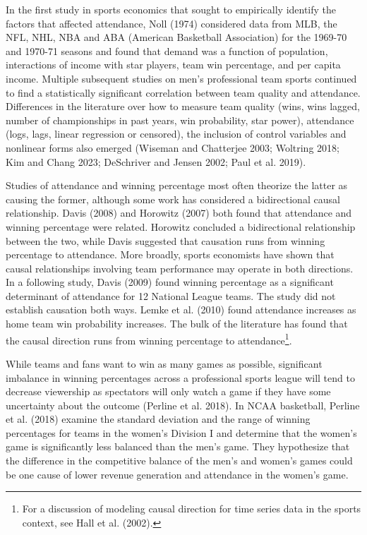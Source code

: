 \documentclass[
  letterpaper,
  DIV=11,
  numbers=noendperiod]{scrartcl}
\begin{document}
In the first study in sports economics that sought to empirically
identify the factors that affected attendance, Noll (1974) considered
data from MLB, the NFL, NHL, NBA and ABA (American Basketball
Association) for the 1969-70 and 1970-71 seasons and found that demand
was a function of population, interactions of income with star players,
team win percentage, and per capita income. Multiple subsequent studies
on men's professional team sports continued to find a statistically
significant correlation between team quality and attendance. Differences
in the literature over how to measure team quality (wins, wins lagged,
number of championships in past years, win probability, star power),
attendance (logs, lags, linear regression or censored), the inclusion of
control variables and nonlinear forms also emerged (Wiseman and
Chatterjee 2003; Woltring 2018; Kim and Chang 2023; DeSchriver and
Jensen 2002; Paul et al. 2019).

Studies of attendance and winning percentage most often theorize the
latter as causing the former, although some work has considered a
bidirectional causal relationship. Davis (2008) and Horowitz (2007) both
found that attendance and winning percentage were related. Horowitz
concluded a bidirectional relationship between the two, while Davis
suggested that causation runs from winning percentage to attendance.
More broadly, sports economists have shown that causal relationships
involving team performance may operate in both directions.\\
In a following study, Davis (2009) found winning percentage as a
significant determinant of attendance for 12 National League teams. The
study did not establish causation both ways. Lemke et al. (2010) found
attendance increases as home team win probability increases. The bulk of
the literature has found that the causal direction runs from winning
percentage to attendance\footnote{For a discussion of modeling causal
  direction for time series data in the sports context, see Hall et al.
  (2002).}.

While teams and fans want to win as many games as possible, significant
imbalance in winning percentages across a professional sports league
will tend to decrease viewership as spectators will only watch a game if
they have some uncertainty about the outcome (Perline et al. 2018). In
NCAA basketball, Perline et al. (2018) examine the standard deviation
and the range of winning percentages for teams in the women's Division I
and determine that the women's game is significantly less balanced than
the men's game. They hypothesize that the difference in the competitive
balance of the men's and women's games could be one cause of lower
revenue generation and attendance in the women's game.
\end{document}
